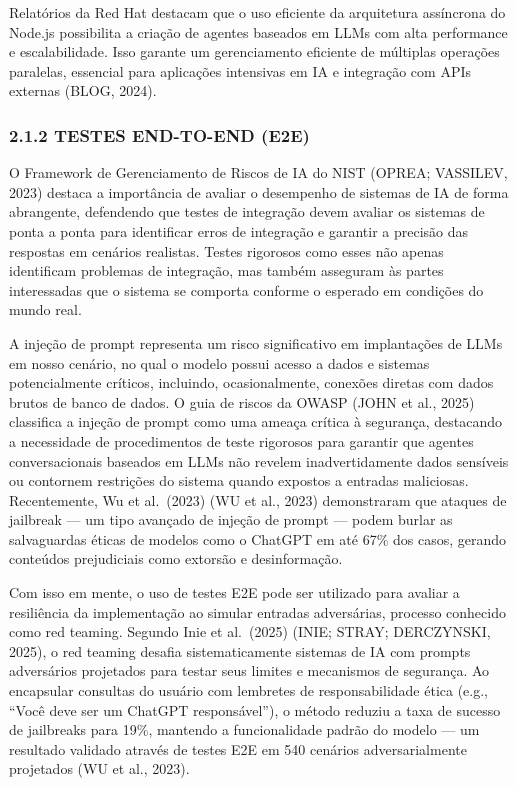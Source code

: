 \documentclass[
]{article}
\begin{document}
Relatórios da Red Hat destacam que o uso eficiente da arquitetura
assíncrona do Node.js possibilita a criação de agentes baseados em LLMs
com alta performance e escalabilidade. Isso garante um gerenciamento
eficiente de múltiplas operações paralelas, essencial para aplicações
intensivas em IA e integração com APIs externas (BLOG, 2024).

\subsubsection{2.1.2 TESTES END-TO-END
(E2E)}\label{testes-end-to-end-e2e}

O Framework de Gerenciamento de Riscos de IA do NIST (OPREA; VASSILEV,
2023) destaca a importância de avaliar o desempenho de sistemas de IA de
forma abrangente, defendendo que testes de integração devem avaliar os
sistemas de ponta a ponta para identificar erros de integração e
garantir a precisão das respostas em cenários realistas. Testes
rigorosos como esses não apenas identificam problemas de integração, mas
também asseguram às partes interessadas que o sistema se comporta
conforme o esperado em condições do mundo real.

A injeção de prompt representa um risco significativo em implantações de
LLMs em nosso cenário, no qual o modelo possui acesso a dados e sistemas
potencialmente críticos, incluindo, ocasionalmente, conexões diretas com
dados brutos de banco de dados. O guia de riscos da OWASP (JOHN et al.,
2025) classifica a injeção de prompt como uma ameaça crítica à
segurança, destacando a necessidade de procedimentos de teste rigorosos
para garantir que agentes conversacionais baseados em LLMs não revelem
inadvertidamente dados sensíveis ou contornem restrições do sistema
quando expostos a entradas maliciosas. Recentemente, Wu et al.~(2023)
(WU et al., 2023) demonstraram que ataques de jailbreak --- um tipo
avançado de injeção de prompt --- podem burlar as salvaguardas éticas de
modelos como o ChatGPT em até 67\% dos casos, gerando conteúdos
prejudiciais como extorsão e desinformação.

Com isso em mente, o uso de testes E2E pode ser utilizado para avaliar a
resiliência da implementação ao simular entradas adversárias, processo
conhecido como red teaming. Segundo Inie et al.~(2025) (INIE; STRAY;
DERCZYNSKI, 2025), o red teaming desafia sistematicamente sistemas de IA
com prompts adversários projetados para testar seus limites e mecanismos
de segurança. Ao encapsular consultas do usuário com lembretes de
responsabilidade ética (e.g., ``Você deve ser um ChatGPT responsável''),
o método reduziu a taxa de sucesso de jailbreaks para 19\%, mantendo a
funcionalidade padrão do modelo --- um resultado validado através de
testes E2E em 540 cenários adversarialmente projetados (WU et al.,
2023).
\end{document}
